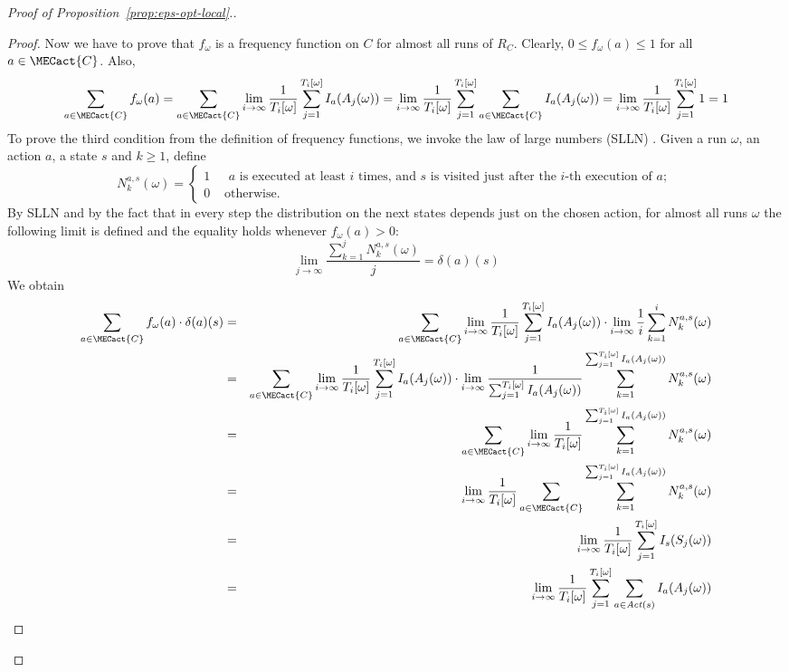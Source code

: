 \begin{proof}[Proof of Proposition~\ref{prop:eps-opt-local}.]
\begin{proof}
Now we have to prove that $f_{\omega}$ is a frequency function on $C$ for almost all runs of $R_C$. Clearly, $0\leq f_{\omega}(a)\leq 1$ for all $a\in \MECact{C}$. Also,
\[
\sum_{a\in \MECact{C}} f_{\omega}(a)=\sum_{a\in \MECact{C}} \lim_{i\rightarrow \infty} \frac{1}{T_i[\omega]} \sum_{j=1}^{T_i[\omega]} I_{a}(A_j(\omega))=\lim_{i\rightarrow \infty} \frac{1}{T_i[\omega]} \sum_{j=1}^{T_i[\omega]} \sum_{a\in \MECact{C}}I_{a}(A_j(\omega))
=\lim_{i\rightarrow \infty} \frac{1}{T_i[\omega]} \sum_{j=1}^{T_i[\omega]} 1=1
\]
To prove the third condition from the definition of frequency functions, we invoke the law of large numbers (SLLN) \cite{Billingsley:book}. Given a run $\omega$, an action $a$, a state $s$ and $k\geq 1$, define
\[
N^{a,s}_k(\omega)=\begin{cases}
  1 & \text{ $a$ is executed at least $i$ times, and $s$ is visited just after the $i$-th execution of $a$; }\\
  0 & \text{ otherwise.}
\end{cases}
\]
By SLLN and by the fact that in every step the distribution on the next states depends just on the chosen action, for almost all runs $\omega$ the following limit is defined and the equality holds whenever $f_\omega(a) > 0$:
\[
\lim_{j\rightarrow \infty} \frac{\sum_{k=1}^j N^{a,s}_k(\omega)}{j} = \delta(a)(s)
\]
We obtain
\begin{eqnarray*}
\sum_{a\in \MECact{C}} f_{\omega}(a)\cdot \delta(a)(s) & = &  \sum_{a\in \MECact{C}} \lim_{i\rightarrow \infty} \frac{1}{T_i[\omega]} \sum_{j=1}^{T_i[\omega]} I_a(A_j(\omega))\cdot   
  \lim_{i\rightarrow \infty} \frac{1}{i}\sum_{k=1}^{i} N^{a,s}_k(\omega) \\
& = & \sum_{a\in \MECact{C}} \lim_{i\rightarrow \infty} \frac{1}{T_i[\omega]} \sum_{j=1}^{T_i[\omega]} I_a(A_j(\omega))\cdot \lim_{i\rightarrow \infty} \frac{1}{\sum_{j=1}^{T_i[\omega]} I_a(A_j(\omega))}\sum_{k=1}^{\sum_{j=1}^{T_i[\omega]} I_a(A_j(\omega))} N^{a,s}_k(\omega) \\
& = & \sum_{a\in \MECact{C}} \lim_{i\rightarrow \infty} \frac{1}{T_i[\omega]}\sum_{k=1}^{\sum_{j=1}^{T_i[\omega]} I_a(A_j(\omega))} N^{a,s}_k(\omega) \\
& = & \lim_{i\rightarrow \infty} \frac{1}{T_i[\omega]}\sum_{a\in \MECact{C}} \sum_{k=1}^{\sum_{j=1}^{T_i[\omega]} I_a(A_j(\omega))} N^{a,s}_k(\omega) \\
& = & \lim_{i\rightarrow \infty} \frac{1}{T_i[\omega]}\sum_{j=1}^{T_i[\omega]} I_s(S_j(\omega)) \\
& = & \lim_{i\rightarrow \infty} \frac{1}{T_i[\omega]}\sum_{j=1}^{T_i[\omega]} \sum_{a\in \mathit{Act}(s)} I_a(A_j(\omega)) \\

\end{eqnarray*}
\end{proof}
\end{proof}
